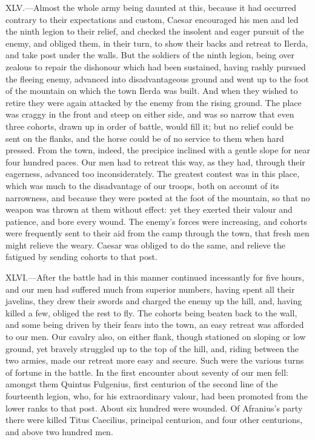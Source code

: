 XLV.—Almost the whole army being daunted at this, because it had
occurred contrary to their expectations and custom, Caesar encouraged
his men and led the ninth legion to their relief, and checked the
insolent and eager pursuit of the enemy, and obliged them, in their
turn, to show their backs and retreat to Ilerda, and take post under the
walls. But the soldiers of the ninth legion, being over zealous to
repair the dishonour which had been sustained, having rashly pursued the
fleeing enemy, advanced into disadvantageous ground and went up to the
foot of the mountain on which the town Ilerda was built. And when they
wished to retire they were again attacked by the enemy from the rising
ground. The place was craggy in the front and steep on either side, and
was so narrow that even three cohorts, drawn up in order of battle,
would fill it; but no relief could be sent on the flanks, and the horse
could be of no service to them when hard pressed. From the town, indeed,
the precipice inclined with a gentle slope for near four hundred paces.
Our men had to retreat this way, as they had, through their eagerness,
advanced too inconsiderately. The greatest contest was in this place,
which was much to the disadvantage of our troops, both on account of its
narrowness, and because they were posted at the foot of the mountain, so
that no weapon was thrown at them without effect: yet they exerted their
valour and patience, and bore every wound. The enemy's forces were
increasing, and cohorts were frequently sent to their aid from the camp
through the town, that fresh men might relieve the weary. Caesar was
obliged to do the same, and relieve the fatigued by sending cohorts to
that post.

XLVI.—After the battle had in this manner continued incessantly for
five hours, and our men had suffered much from superior numbers, having
spent all their javelins, they drew their swords and charged the enemy
up the hill, and, having killed a few, obliged the rest to fly. The
cohorts being beaten back to the wall, and some being driven by their
fears into the town, an easy retreat was afforded to our men. Our
cavalry also, on either flank, though stationed on sloping or low
ground, yet bravely struggled up to the top of the hill, and, riding
between the two armies, made our retreat more easy and secure. Such were
the various turns of fortune in the battle. In the first encounter about
seventy of our men fell: amongst them Quintus Fulgenius, first centurion
of the second line of the fourteenth legion, who, for his extraordinary
valour, had been promoted from the lower ranks to that post. About six
hundred were wounded. Of Afranius's party there were killed Titus
Caecilius, principal centurion, and four other centurions, and above two
hundred men.

